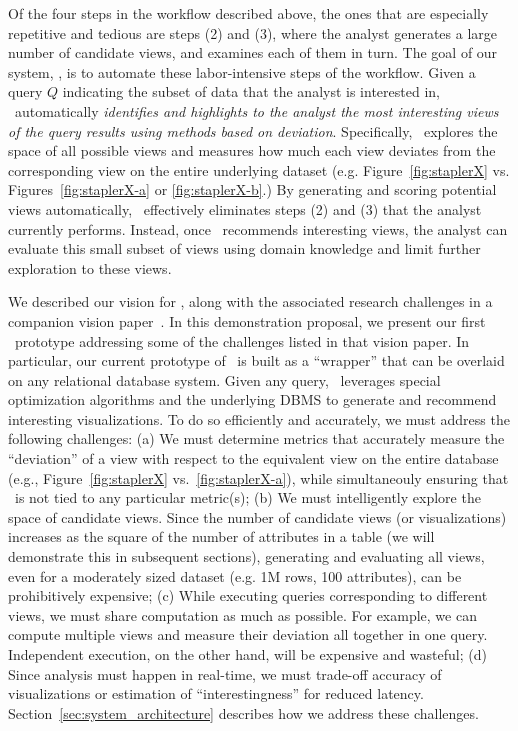 Of the four steps in the workflow described above, the 
ones that are especially repetitive and tedious are steps (2) and (3),
where the analyst generates a large number of candidate views, and examines each
of them in turn. The goal of our system, \VizRecDB, is to automate these
labor-intensive steps of the workflow. Given a query $Q$ indicating the subset
of data that the analyst is interested in, \VizRecDB\ automatically {\em identifies and highlights to the analyst the most
interesting views of the query results using methods based on
deviation}. Specifically, \VizRecDB\ explores the space of all possible views and
measures how much each view deviates from the corresponding view on the
entire underlying dataset (e.g. Figure~\ref{fig:staplerX} vs.
Figures~\ref{fig:staplerX-a} or \ref{fig:staplerX-b}.) By generating and
scoring potential views automatically, \VizRecDB\ effectively eliminates
steps (2) and (3) that the analyst currently performs. Instead, once \VizRecDB\
recommends interesting views, the analyst can evaluate this small
subset of views using domain knowledge and limit further
exploration to these views.  

We described our vision for \VizRecDB, along with the associated research
challenges in a companion vision paper~\cite{DBLP:conf/vldb/Parameswaran2013}.
In this demonstration proposal, we present our first \VizRecDB\ prototype
addressing some of the challenges listed in that vision paper.
In particular, our current prototype of \VizRecDB\ is built as a ``wrapper'' that
can be overlaid on any relational database system. Given any query, \VizRecDB\
leverages special optimization algorithms and the underlying DBMS to generate
and recommend interesting visualizations. To do so efficiently and accurately,
we must address the following challenges:
(a) We must determine metrics that accurately measure the ``deviation'' of a
view with respect to the equivalent view on the entire database (e.g.,
Figure~\ref{fig:staplerX} vs.~\ref{fig:staplerX-a}), while simultaneouly
ensuring that \VizRecDB\ is not tied to any particular metric(s); (b) We must
intelligently explore the space of candidate views. Since the number of
candidate views (or visualizations) increases as the square of the number of
attributes in a table (we will demonstrate this in subsequent sections),
generating and evaluating all views, even for a moderately sized dataset (e.g.
1M rows, 100 attributes), can be prohibitively expensive;
(c) While executing queries corresponding to different views, we must share
computation as much as possible. For example, 
we can compute multiple views and measure their deviation 
all together in one query. Independent execution,
on the other hand, will be expensive and wasteful;
(d) Since
analysis must happen in real-time, we must trade-off accuracy
of visualizations or estimation of ``interestingness'' for reduced latency.
Section~\ref{sec:system_architecture} describes how we address these challenges.



